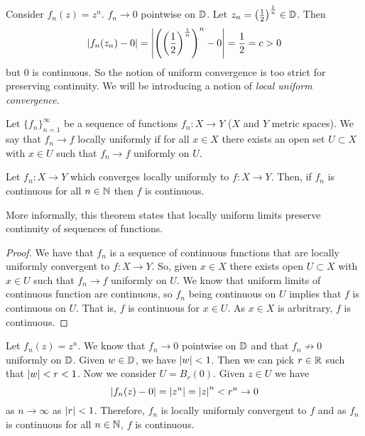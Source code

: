 \begin{remark}
    Consider $f_n(z) = z^n$. $f_n \to 0$ pointwise on $\mathbb{D}$. 
    Let $z_n = \left(\frac12\right)^{\frac1n} \in \mathbb{D}$. Then
    \[ \left\lvert f_n(z_n) - 0\right\rvert = \left\lvert\left(\left(\frac12\right)^{\frac1n}\right)^n - 0\right\rvert = \frac12 = c > 0 \]
    but $0$ is continuous. 
    So the notion of uniform convergence is too strict for preserving continuity.
    We will be introducing a notion of \emph{local uniform convergence}.
\end{remark}

\begin{definition}
    Let $\{f_n\}_{n = 1}^\infty$ be a sequence of functions $f_n: X \to Y$ ($X$ and $Y$ metric spaces). We say that $f_n \to f$ locally uniformly if for all $x \in X$ there exists an open set $U \subset X$ with $x \in U$ such that $f_n \to f$ uniformly on $U$.
\end{definition}

\begin{theorem}[]
    Let $f_n: X \to Y$ which converges locally uniformly to $f: X \to Y$. Then, if $f_n$ is continuous for all $n \in \mathbb{N}$ then $f$ is continuous.
\end{theorem}

More informally, this theorem states that locally uniform limits preserve continuity of sequences of functions.

\begin{proof}
    We have that $f_n$ is a sequence of continuous functions that are locally uniformly convergent to $f: X \to Y$. 
    So, given $x \in X$ there exists open $U \subset X$ with $x \in U$ such that $f_n \to f$ uniformly on $U$. 
    We know that uniform limits of continuous function are continuous, so $f_n$ being continuous on $U$ implies that $f$ is continuous on $U$.
    That is, $f$ is continuous for $x \in U$.
    As $x \in X$ is arbritrary, $f$ is continuous.
\end{proof}

\begin{example}
    Let $f_n(z) = z^n$. 
    We know that $f_n \to 0$ pointwise on $\mathbb{D}$ and that $f_n \not \to 0$ uniformly on $\mathbb{D}$. 
    Given $w \in \mathbb{D}$, we have $\left\lvert w\right\rvert < 1$.
    Then we can pick $r \in \mathbb{R}$ such that $\left\lvert w\right\rvert < r < 1$. 
    Now we consider $U = B_r(0)$. 
    Given $z \in U$ we have
    \[\left\lvert f_n(z) - 0\right\rvert = \left\lvert z^n\right\rvert = \left\lvert z\right\rvert^n < r^n  \to 0\]
    as $n \to \infty$ as $\left\lvert r\right\rvert < 1$. 
    Therefore, $f_n$ is locally uniformly convergent to $f$ and as $f_n$ is continuous for all $n \in \mathbb{N}$, $f$ is continuous.
\end{example}
